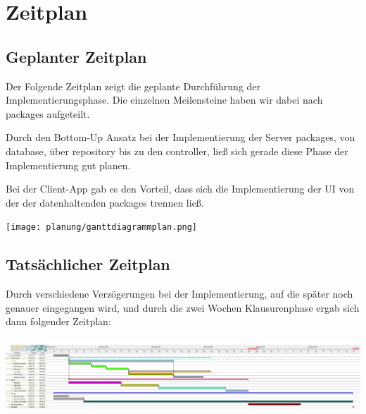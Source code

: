 
\section{Zeitplan}

    \subsection{Geplanter Zeitplan}

        Der Folgende Zeitplan zeigt die geplante Durchführung der Implementierungsphase. Die einzelnen Meilensteine haben wir dabei nach packages aufgeteilt.

        Durch den Bottom-Up Ansatz bei der Implementierung der Server packages, von database, über repository bis zu den controller, ließ sich gerade diese Phase der Implementierung gut planen.

        Bei der Client-App gab es den Vorteil, dass sich die Implementierung der UI von der der datenhaltenden packages trennen ließ.

        \texttt{[image: planung/ganttdiagrammplan.png]}

    \subsection{Tatsächlicher Zeitplan}

        Durch verschiedene Verzögerungen bei der Implementierung, auf die später noch genauer eingegangen wird, und durch die zwei Wochen Klausurenphase ergab sich dann folgender Zeitplan:

        \includegraphics[angle = 90, scale = 0.23]{planung/ganttdiagrammactual.png}
